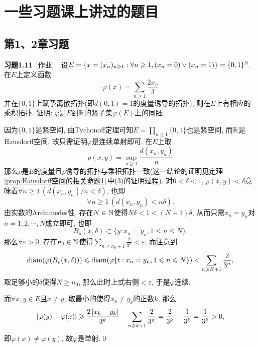 
\chapter{一些习题课上讲过的题目}

\section{第1、2章习题}

	\textbf{习题1.11}\ [作业]\ \ 设$ E=\{ x=(x_n)_{n\geqslant 1} : \forall n\geqslant 1, (x_n=0)\lor(x_n=1) \}=\{ 0,1 \}^{\mathbb{N}} $. 在$ E $上定义函数
	\[
	\varphi(x)=\sum_{n\geqslant 1}\frac{2x_n}{3}
	\]
	并在$ \{ 0,1 \} $上赋予离散拓扑(即$ d(0,1)=1 $的度量诱导的拓扑), 则在$ E $上有相应的乘积拓扑. 证明: $ \varphi $是$ E $到$ \mathbb{R} $的紧子集$ \varphi(E) $上的同胚.
	\begin{Proof}
	因为$ \{ 0,1 \} $是紧空间, 由Tychonoff定理可知$ E=\prod\limits_{n\geqslant 1}\{ 0,1 \} $也是紧空间, 而$ \mathbb{R} $是Hausdorff空间, 故只需证明$ \varphi $是连续单射即可. 在$ E $上取
	\[
	\rho(x,y)=\sup_{n\geqslant 1}\frac{d(x_n,y_n)}{n}
	\]
	那么$ \rho $是$ E $的度量且$ \rho $诱导的拓扑与乘积拓扑一致(这一结论的证明见定理\,\ref{prop:Hausdorff空间的相关命题1}\,中(3)的证明过程). 对$ 0<\delta<1 $, $ \rho(x,y)<\delta $意味着$ \forall n\geqslant 1\,(d(x_n,y_n)/n<\delta) $, 也即
	\[
	\forall n\geqslant 1\,(d(x_n,y_n)<n\delta).
	\]
	由实数的Archimedes性, 存在$ N\in\mathbb{N} $使得$ N\delta<1<(N+1)\delta $, 从而只需$ x_n=y_n $对$ n=1,2,\cdots,N $成立即可, 也即
	\[
	B_\rho(x,\delta)\subset\{ y : x_n=y_n, 1\leqslant n\leqslant N \}.
	\]
	那么$ \forall\varepsilon>0 $, 存在$ n_0\in\mathbb{N} $使得$ \sum\limits_{n\geqslant n_0+1}\frac{2}{3^n}<\varepsilon $, 而注意到
	\[
	\operatorname{diam}(\varphi(B_\rho(x,\delta)))\leqslant\operatorname{diam}(\varphi\{ t : x_n=y_n, 1\leqslant n\leqslant N \})<\sum_{n\geqslant N+1}\frac{2}{3^n},
	\]
	取足够小的$ \delta $使得$ N\geqslant n_0 $, 那么此时上式右侧$ <\varepsilon $, 于是$ \varphi $连续.
	
	而$ \forall x,y\in E $且$ x\ne y $, 取最小的使得$ x_k\ne y_k $的正数$ k $, 那么
	\[
	\left| \varphi(y)-\varphi(x) \right| \geqslant\frac{2\left| x_k-y_k \right| }{3^k}-\sum_{n\geqslant k+1}\frac{2}{3^n}=\frac{2}{3^k}-\frac{1}{3^k}=\frac{1}{3^k}>0,
	\]
	即$ \varphi(x)\ne\varphi(y) $, 故$ \varphi $是单射.\qed
	\end{Proof}

